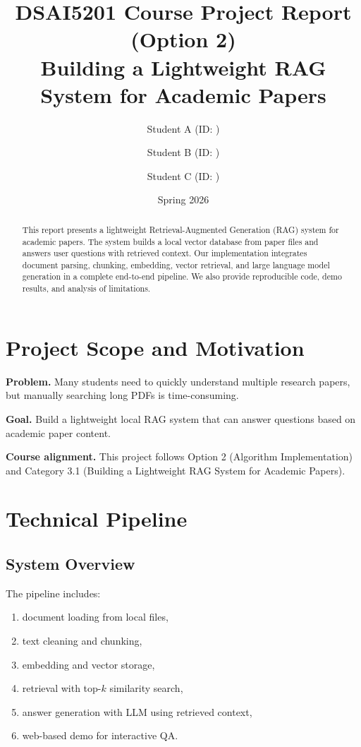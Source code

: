 \documentclass[11pt,a4paper]{article}
\title{\textbf{DSAI5201 Course Project Report (Option 2)}\\
Building a Lightweight RAG System for Academic Papers}
\author{
Student A (ID: \underline{\hspace{3cm}}) \and
Student B (ID: \underline{\hspace{3cm}}) \and
Student C (ID: \underline{\hspace{3cm}})
}
\date{Spring 2026}
\begin{document}
\maketitle

\begin{abstract}
This report presents a lightweight Retrieval-Augmented Generation (RAG) system for academic papers.
The system builds a local vector database from paper files and answers user questions with retrieved context.
Our implementation integrates document parsing, chunking, embedding, vector retrieval, and large language model generation in a complete end-to-end pipeline.
We also provide reproducible code, demo results, and analysis of limitations.
\end{abstract}

\section{Project Scope and Motivation}
\textbf{Problem.}
Many students need to quickly understand multiple research papers, but manually searching long PDFs is time-consuming.

\textbf{Goal.}
Build a lightweight local RAG system that can answer questions based on academic paper content.

\textbf{Course alignment.}
This project follows Option 2 (Algorithm Implementation) and Category 3.1 (Building a Lightweight RAG System for Academic Papers).

\section{Technical Pipeline}
\subsection{System Overview}
The pipeline includes:
\begin{enumerate}[leftmargin=1.4em]
  \item document loading from local files,
  \item text cleaning and chunking,
  \item embedding and vector storage,
  \item retrieval with top-$k$ similarity search,
  \item answer generation with LLM using retrieved context,
  \item web-based demo for interactive QA.
\end{enumerate}
\end{document}
